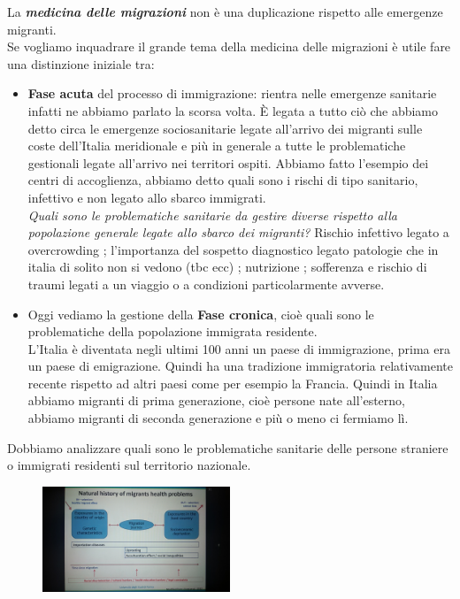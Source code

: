 La \textbf{\emph{medicina delle migrazioni}} non è una duplicazione
rispetto alle emergenze migranti.\\
Se vogliamo inquadrare il grande tema della medicina delle migrazioni è
utile fare una distinzione iniziale tra:\\
\begin{itemize}
\item \textbf{Fase acuta} del processo di immigrazione: rientra nelle
emergenze sanitarie infatti ne abbiamo parlato la scorsa volta. È legata
a tutto ciò che abbiamo detto circa le emergenze sociosanitarie legate
all'arrivo dei migranti sulle coste dell'Italia meridionale e più in
generale a tutte le problematiche gestionali legate all'arrivo nei
territori ospiti. Abbiamo fatto l'esempio dei centri di accoglienza,
abbiamo detto quali sono i rischi di tipo sanitario, infettivo e non
legato allo sbarco immigrati.\\
\emph{Quali sono le problematiche sanitarie da gestire diverse rispetto
alla popolazione generale legate allo sbarco dei migranti?} Rischio
infettivo legato a overcrowding ; l'importanza del sospetto diagnostico
legato patologie che in italia di solito non si vedono (tbc ecc) ;
nutrizione ; sofferenza e rischio di traumi legati a un viaggio o a
condizioni particolarmente avverse.
\item Oggi vediamo la gestione della \textbf{Fase cronica}, cioè quali sono
le problematiche della popolazione immigrata residente.\\
L'Italia è diventata negli ultimi 100 anni un paese di immigrazione,
prima era un paese di emigrazione. Quindi ha una tradizione immigratoria
relativamente recente rispetto ad altri paesi come per esempio la
Francia. Quindi in Italia abbiamo migranti di prima generazione, cioè
persone nate all'esterno, abbiamo migranti di seconda generazione e più
o meno ci fermiamo lì.
\end{itemize}
Dobbiamo analizzare quali sono le problematiche sanitarie delle persone
straniere o immigrati residenti sul territorio nazionale.

\begin{figure}[!ht]
\centering
	\includegraphics[width=0.5\textwidth]{27/image1.jpeg}
	\end{figure}

